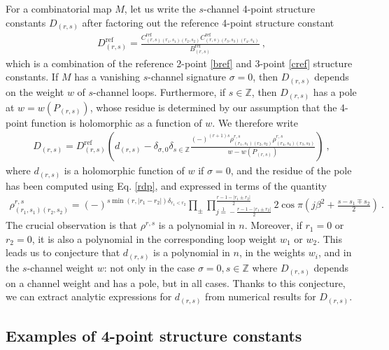 \documentclass[12pt, a4paper]{article}
\newcommand{\qvertex}{
\coordinate (base) at (0, 1);
\draw (0, 0) node [cross]{};
  \draw (3, 0) node [cross]{};
  \draw (0, 3) node[cross]{};
  \draw (3, 3) node[cross]{};
}
\newcommand{\vertices}{
\coordinate (base) at (0, 1);
\draw (0, 0) node[fill, circle, minimum size = 1.3mm, inner sep = 0]{};
  \draw (3, 0) node[fill, circle, minimum size = 1.3mm, inner sep = 0]{};
  \draw (0, 3) node[fill, circle, minimum size = 1.3mm, inner sep = 0]{};
  \draw (3, 3) node[fill, circle, minimum size = 1.3mm, inner sep = 0]{};
}
\theoremstyle{break}
\begin{document}
For a combinatorial map $M$, let us write the $s$-channel 4-point structure constants $D_{(r,s)}$ after factoring out the reference 4-point structure constant 
\begin{align}
 D_{(r,s)}^\text{ref} = \frac{C^\text{ref}_{(r,s)(r_1,s_1)(r_2,s_2)} C^\text{ref}_{(r,s)(r_3,s_3)(r_4,s_4)}}{B^\text{ref}_{(r,s)}}\ , 
\end{align}
which is a combination of the reference 2-point \eqref{bref} and 3-point \eqref{cref} structure constants. If $M$ has a vanishing $s$-channel signature $\sigma=0$, then $D_{(r,s)}$ depends on the weight $w$ of $s$-channel loops. Furthermore, if $s\in\mathbb{Z}$, then $D_{(r,s)}$ has a pole at $w=w(P_{(r,s)})$, whose residue is determined by our assumption that the 4-point function is holomorphic as a function of $w$. We therefore write 
\begin{align}
 D_{(r,s)} =  D_{(r,s)}^\text{ref} \left(d_{(r,s)}  - \delta_{\sigma,0}\delta_{s\in\mathbb{Z}}\frac{(-)^{(r+1)s}\rho^{r,s}_{(r_1,s_1)(r_2,s_2)}\rho^{r,s}_{(r_4,s_4)(r_3,s_3)}}{w-w(P_{(r,s)})}\right) \ ,
\end{align}
where $d_{(r,s)}$ is a holomorphic function of $w$ if $\sigma=0$, and the residue of the pole has been computed using Eq. \eqref{rdp}, and expressed in terms of the quantity
\begin{align}
\rho^{r,s}_{(r_1,s_1)(r_2,s_2)}= (-)^{s\min(r,|r_1-r_2|)\delta_{r_1<r_2}} \prod_\pm \prod_{j\overset{1}{=}-\frac{r-1-|r_1\pm r_2|}{2}}^{\frac{r-1-|r_1\pm r_2|}{2}} 2\cos\pi\left(j\beta^2+\tfrac{s-s_1\mp s_2}{2}\right)\ . 
 \label{rhop}
\end{align}
The crucial observation is that $\rho^{r,s}$ is a polynomial in $n$. Moreover, if $r_1=0$ or $r_2=0$, it is also a polynomial in the corresponding loop weight $w_1$ or $w_2$. This leads us to conjecture that $d_{(r,s)}$ is a polynomial in $n$, in the weights $w_i$, and in the $s$-channel weight $w$: not only in the case $\sigma=0, s\in\mathbb{Z}$ where $D_{(r,s)}$ depends on a channel weight and has a pole, but in all cases. 
Thanks to this conjecture, we can extract analytic expressions for $d_{(r,s)}$ from numerical results for $D_{(r,s)}$. 


\subsection{Examples of 4-point structure constants}\label{sec:ex4pt}

\DeclareRobustCommand\picz{
$
\begin{tikzpicture}[baseline=(base), scale = .25]
 \qvertex;
 \end{tikzpicture}
 $
}
\DeclareRobustCommand\pice{
$
\begin{tikzpicture}[baseline=(base), scale = .25]
  \vertices
  \draw (0, 0) -- (0, 3);
  \draw (3, 0) -- (3, 3);
 \end{tikzpicture}
$}
\DeclareRobustCommand\picj{
$
\begin{tikzpicture}[baseline=(base), scale = .25]
  \vertices
  \draw (0, 0) -- (3, 3) to [out = -120, in = 30] (0, 0);
  \draw (0,0) -- (0, 3);
  \draw (0, 3) to [out = 30, in = 135] (3.5, 3.5) to [out = -45, in =60] (3, 0);
 \end{tikzpicture}
 $}
\end{document}

